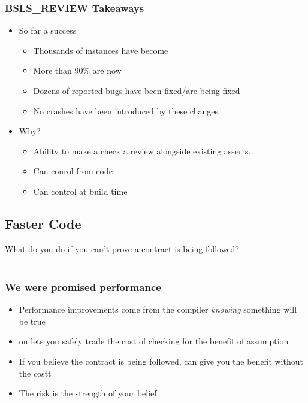 \begin{frame}
  \frametitle{BSLS_REVIEW Takeaways}

  \begin{itemize}
  \item So far a success \pause
    \begin{itemize}
    \item Thousands of  instances have become  \pause
    \item More than 90\% are now  \pause
    \item Dozens of reported bugs have been fixed/are being fixed \pause
    \item No crashes have been introduced by these changes \pause
    \end{itemize}
  \item Why? \pause
    \begin{itemize}
    \item Ability to make a check a review alongside existing asserts. \pause
    \item Can conrol from code \pause
    \item Can control at build time
    \end{itemize}
  \end{itemize}
\end{frame}

\subsection{Faster Code}
\begin{frame}
  What do you do if you can't prove a contract is being followed? \\
  \\ \pause
\end{frame}
  
\begin{frame}
  \tableofcontents[currentsection,currentsubsection,subsectionstyle=show/shaded/hide]
\end{frame}

\begin{frame}
  \frametitle{We were promised performance}

  \begin{itemize}
  \item Performance improvements come from the compiler \emph{knowing}
    something will be true \pause
  \item \cc{[[noreturn]]} on  lets you safely trade the
    cost of checking for the benefit of assumption \pause
  \item If you believe the contract is being followed,  can
    give you the benefit without the costt \pause
  \item The risk is the strength of your belief
  \end{itemize}
\end{frame}

